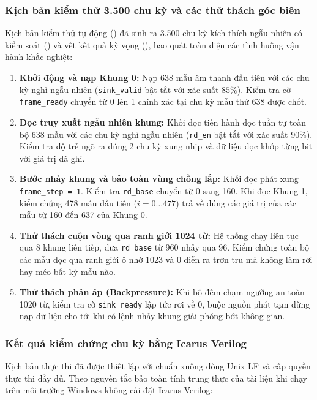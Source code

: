 \subsubsection*{Kịch bản kiểm thử 3.500 chu kỳ và các thử thách góc biên}
Kịch bản kiểm thử tự động () đã sinh ra 3.500 chu kỳ kích thích ngẫu nhiên có kiểm soát () và vết kết quả kỳ vọng (), bao quát toàn diện các tình huống vận hành khắc nghiệt:
\begin{enumerate}[leftmargin=1.5em, itemsep=2pt]
    \item \textbf{Khởi động và nạp Khung 0:} Nạp 638 mẫu âm thanh đầu tiên với các chu kỳ nghỉ ngẫu nhiên (\texttt{sink\_valid} bật tắt với xác suất $85\%$). Kiểm tra cờ \texttt{frame\_ready} chuyển từ 0 lên 1 chính xác tại chu kỳ mẫu thứ 638 được chốt.
    \item \textbf{Đọc truy xuất ngẫu nhiên khung:} Khối đọc tiến hành đọc tuần tự toàn bộ 638 mẫu với các chu kỳ nghỉ ngẫu nhiên (\texttt{rd\_en} bật tắt với xác suất $90\%$). Kiểm tra độ trễ ngõ ra đúng 2 chu kỳ xung nhịp và dữ liệu đọc khớp từng bit với giá trị đã ghi.
    \item \textbf{Bước nhảy khung và bảo toàn vùng chồng lấp:} Khối đọc phát xung \texttt{frame\_step = 1}. Kiểm tra \texttt{rd\_base} chuyển từ 0 sang 160. Khi đọc Khung 1, kiểm chứng 478 mẫu đầu tiên ($i = 0 \dots 477$) trả về đúng các giá trị của các mẫu từ 160 đến 637 của Khung 0.
    \item \textbf{Thử thách cuộn vòng qua ranh giới 1024 từ:} Hệ thống chạy liên tục qua 8 khung liên tiếp, đưa \texttt{rd\_base} từ 960 nhảy qua 96. Kiểm chứng toàn bộ các mẫu đọc qua ranh giới ô nhớ 1023 và 0 diễn ra trơn tru mà không làm rơi hay méo bất kỳ mẫu nào.
    \item \textbf{Thử thách phản áp (Backpressure):} Khi bộ đếm chạm ngưỡng an toàn 1020 từ, kiểm tra cờ \texttt{sink\_ready} lập tức rơi về 0, buộc nguồn phát tạm dừng nạp dữ liệu cho tới khi có lệnh nhảy khung giải phóng bớt không gian.
\end{enumerate}

\subsubsection*{Kết quả kiểm chứng chu kỳ bằng Icarus Verilog}
Kịch bản thực thi  đã được thiết lập với chuẩn xuống dòng Unix LF và cấp quyền thực thi đầy đủ. Theo nguyên tắc bảo toàn tính trung thực của tài liệu khi chạy trên môi trường Windows không cài đặt Icarus Verilog:

